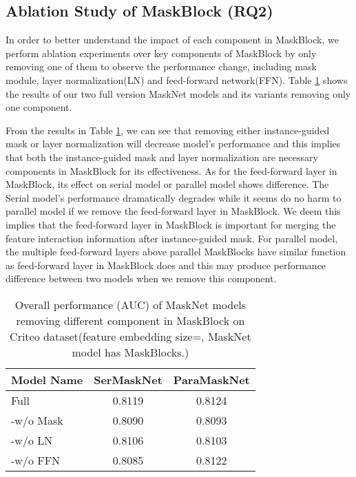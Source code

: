 \documentclass[sigconf]{acmart}
\begin{document}
\subsection{Ablation Study of MaskBlock (RQ2)}
In order to better understand the impact of each component in MaskBlock, we perform ablation experiments over key components of  MaskBlock by only removing one of them  to observe the performance change, including mask module, layer normalization(LN) and feed-forward network(FFN). Table \ref{tab:table4} shows the results of our two full version MaskNet models and its variants removing only one component.



From the results in Table \ref{tab:table4}, we can see that removing either instance-guided mask or layer normalization will decrease  model's performance and this implies that both the instance-guided mask and layer normalization are necessary components in  MaskBlock for its effectiveness. As for the feed-forward layer in MaskBlock, its effect on serial model or parallel model shows difference. The Serial model’s performance dramatically degrades while it seems do no harm to parallel model if we remove the feed-forward layer in MaskBlock. We deem this implies that the feed-forward layer in MaskBlock is important for merging the feature interaction information after instance-guided mask. For parallel model, the multiple feed-forward layers above parallel MaskBlocks have similar function as feed-forward layer in MaskBlock does and this  may produce performance difference between two models when we remove this component.

\begin{table}[h]
  \setlength{\abovecaptionskip}{1pt}
  \caption{Overall performance (AUC) of MaskNet models removing different component in MaskBlock on Criteo dataset(feature embedding size=, MaskNet model has  MaskBlocks.)}
  \label{tab:table4}
  \begin{tabular}{lcc}
  \toprule
   Model Name & SerMaskNet & ParaMaskNet \\
   \midrule
   Full & 0.8119 & 0.8124 \\
   \hline
   -w/o Mask & 0.8090 & 0.8093 \\
   -w/o  LN & 0.8106 & 0.8103 \\
   -w/o FFN & 0.8085 & 0.8122 \\
   \bottomrule
\end{tabular}
\end{table}
\end{document}
